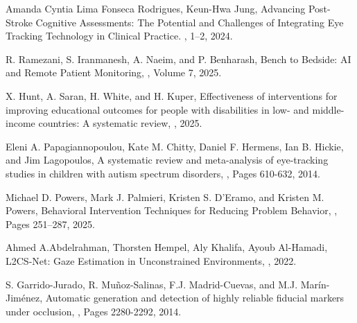 \documentclass[10pt,a4paper,twoside]{article}
\begin{document}
\begin{thebibliography}{*}\label{Refences}

Amanda Cyntia Lima Fonseca Rodrigues, Keun-Hwa Jung,
\newblock Advancing Post-Stroke Cognitive Assessments: The Potential and Challenges of Integrating Eye Tracking Technology in Clinical Practice.
, 1–2, 2024.
\vspace{-7pt}

R. Ramezani, S. Iranmanesh, A. Naeim, and P. Benharash,
\newblock Bench to Bedside: AI and Remote Patient Monitoring,
, Volume 7, 2025.
\vspace{-7pt}

X. Hunt, A. Saran, H. White, and H. Kuper,
\newblock Effectiveness of interventions for improving educational outcomes for people with disabilities in low- and middle-income countries: A systematic review,
, 2025.
\vspace{-7pt}

Eleni A. Papagiannopoulou, Kate M. Chitty, Daniel F. Hermens, Ian B. Hickie, and Jim Lagopoulos,
\newblock A systematic review and meta-analysis of eye-tracking studies in children with autism spectrum disorders,
, Pages 610-632, 2014.
\vspace{-7pt}

Michael D. Powers, Mark J. Palmieri, Kristen S. D'Eramo, and Kristen M. Powers,
 Behavioral Intervention Techniques for Reducing Problem Behavior,
, Pages 251–287, 2025.
\vspace{-7pt}

Ahmed A.Abdelrahman, Thorsten Hempel, Aly Khalifa, Ayoub Al-Hamadi, \newblock L2CS-Net: Gaze Estimation in Unconstrained Environments,
, 2022.
\vspace{-7pt}

S. Garrido-Jurado, R. Muñoz-Salinas, F.J. Madrid-Cuevas, and M.J. Marín-Jiménez,
\newblock Automatic generation and detection of highly reliable fiducial markers under occlusion,
, Pages 2280-2292, 2014.
\vspace{-7pt}


\end{thebibliography}
\end{document}
